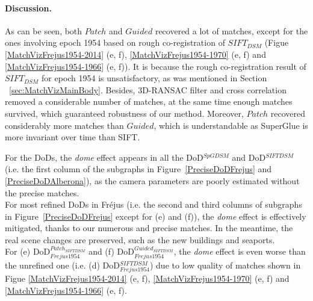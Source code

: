 \paragraph{Discussion.}
\label{para:DiscussionP}
As can be seen, both $Patch$ and $Guided$ recovered a lot of matches, except for the ones involving epoch 1954 based on rough co-registration of $SIFT_{DSM}$ (Figue \ref{MatchVizFrejus1954-2014} (e, f), \ref{MatchVizFrejus1954-1970} (e, f) and \ref{MatchVizFrejus1954-1966} (e, f)). It is because the rough co-registration result of $SIFT_{DSM}$ for epoch 1954 is unsatisfactory, as was mentioned in Section ~\ref{sec:MatchVizMainBody}.
Besides, 3D-RANSAC filter and cross correlation removed a considerable number of matches, at the same time enough matches survived, which guaranteed robustness of our method. Moreover, $Patch$ recovered considerably more matches than $Guided$, which is understandable as SuperGlue is more invariant over time than SIFT.\\
\par
For the \ac{DoD}s, the \textit{dome} effect appears in all the DoD$^{SpGDSM}$ and DoD$^{SIFTDSM}$ (i.e. the first column of the subgraphs in Figure~\ref{PreciseDoDFrejus} and \ref{PreciseDoDAlberona}), as the camera parameters are poorly estimated without the precise matches.\\
For most refined \ac{DoD}s in Fr{\'e}jus (i.e. the second and third columns of subgraphs in Figure~\ref{PreciseDoDFrejus} except for (e) and (f)), the \textit{dome} effect is effectively mitigated, thanks to our numerous and precise matches. In the meantime, the real scene changes are preserved, such as the new buildings and seaports.\\
For (e) \ac{DoD}$_{Frejus1954}^{Patch_{SIFTDSM}}$ and (f) \ac{DoD}$_{Frejus1954}^{Guided_{SIFTDSM}}$, the \textit{dome} effect is even worse than the unrefined one (i.e. (d) \ac{DoD}$_{Frejus1954}^{{SIFTDSM}}$) due to low quality of matches shown in Figue \ref{MatchVizFrejus1954-2014} (e, f), \ref{MatchVizFrejus1954-1970} (e, f) and \ref{MatchVizFrejus1954-1966} (e, f).\\

